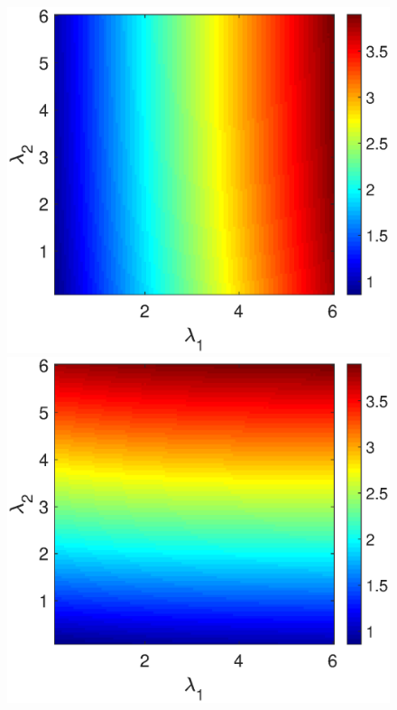 \begin{figure}[h]
  \begin{minipage}{0.32\linewidth}
  \begin{center}
\includegraphics[width=1\linewidth]{Images/photo28_1.eps}
\end{center}
  \end{minipage} 
  \begin{minipage}{0.32\linewidth}
  \begin{center}
\includegraphics[width=1\linewidth]{Images/photo28_2.eps}
\end{center}


\end{minipage}
\end{figure}
